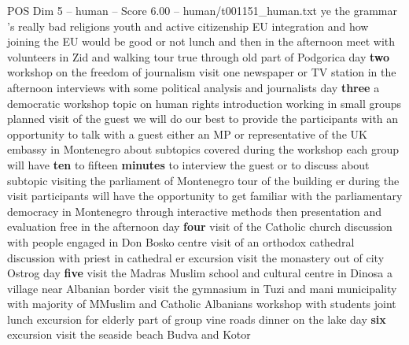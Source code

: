 \begin{textsample}{POS Dim 5 – human – Score 6.00 – human/t001151\_human.txt}  \label{ex:f5_pos_004}
ye the grammar 's really bad religions youth and active citizenship EU integration and how joining the EU would be good or not lunch and then in the afternoon meet with volunteers in Zid and walking tour true through old part of Podgorica day \textbf{two} workshop on the freedom of journalism visit one newspaper or TV station in the afternoon interviews with some political analysis and journalists day \textbf{three} a democratic workshop topic on human rights introduction working in small groups planned visit of the guest we will do our best to provide the participants with an opportunity to talk with a guest either an MP or representative of the UK embassy in Montenegro about subtopics covered during the workshop each group will have \textbf{ten} to fifteen \textbf{minutes} to interview the guest or to discuss about subtopic visiting the parliament of Montenegro tour of the building er during the visit participants will have the opportunity to get familiar with the parliamentary democracy in Montenegro through interactive methods then presentation and evaluation free in the afternoon day \textbf{four} visit of the Catholic church discussion with people engaged in Don Bosko centre visit of an orthodox cathedral discussion with priest in cathedral er excursion visit the monastery out of city Ostrog day \textbf{five} visit the Madras Muslim school and cultural centre in Dinosa a village near Albanian border visit the gymnasium in Tuzi and mani municipality with majority of MMuslim and Catholic Albanians workshop with students joint lunch excursion for elderly part of group vine roads dinner on the lake day \textbf{six} excursion visit the seaside beach Budva and Kotor

\end{textsample}
